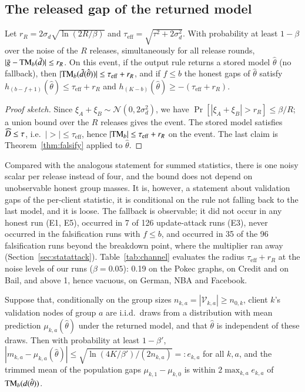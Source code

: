 \subsection{The released gap of the returned model}

\begin{theorem}\label{thm:output}
Let $r_R=2\sigma_d\sqrt{\ln(2R/\beta)}$ and $\tau_{\mathrm{eff}}=\sqrt{\tau^2+2\sigma_d^2}$. With probability at least $1-\beta$ over the noise of the $R$ releases, simultaneously for all release rounds, $|\tilde g-\mathrm{TM}_b(\tilde d)|\le r_R$. On this event, if the output rule returns a stored model $\hat\theta$ (no fallback), then $|\mathrm{TM}_b(\tilde d(\hat\theta))|\le\tau_{\mathrm{eff}}+r_R$, and if $f\le b$ the honest gaps of $\hat\theta$ satisfy $h_{(b-f+1)}(\hat\theta)\le\tau_{\mathrm{eff}}+r_R$ and $h_{(K-b)}(\hat\theta)\ge-(\tau_{\mathrm{eff}}+r_R)$.
\end{theorem}

\begin{proof}[Proof sketch]
Since $\xi_A+\xi_B\sim\mathcal{N}(0,2\sigma_d^2)$, we have $\Pr[|\xi_A+\xi_B|>r_R]\le\beta/R$; a union bound over the $R$ releases gives the event. The stored model satisfies $\widehat{D}\le\tau$, i.e.\ $|\gt|\le\tau_{\mathrm{eff}}$, hence $|\mathrm{TM}_b|\le\tau_{\mathrm{eff}}+r_R$ on the event. The last claim is Theorem~\ref{thm:falsify} applied to $\hat\theta$.
\end{proof}

Compared with the analogous statement for summed statistics, there is one noisy scalar per release instead of four, and the bound does not depend on unobservable honest group masses. It is, however, a statement about validation gaps of the per-client statistic, it is conditional on the rule not falling back to the last model, and it is loose. The fallback is observable; it did not occur in any honest run (E1, E5), occurred in 7 of 126 update-attack runs (E3), never occurred in the falsification runs with $f\le b$, and occurred in 35 of the 96 falsification runs beyond the breakdown point, where the multiplier ran away (Section~\ref{sec:statattack}). Table~\ref{tab:channel} evaluates the radius $\tau_{\mathrm{eff}}+r_R$ at the noise levels of our runs ($\beta=0.05$): 0.19 on the Pokec graphs, \radCredit{} on Credit and \radBail{} on Bail, and above 1, hence vacuous, on German, NBA and Facebook.

\begin{proposition}\label{prop:pop}
Suppose that, conditionally on the group sizes $n_{k,a}=|\mathcal{V}_{k,a}|\ge n_{0,k}$, client $k$'s validation nodes of group $a$ are i.i.d.\ draws from a distribution with mean prediction $\mu_{k,a}(\hat\theta)$ under the returned model, and that $\hat\theta$ is independent of these draws. Then with probability at least $1-\beta'$, $|m_{k,a}-\mu_{k,a}(\hat\theta)|\le\sqrt{\ln(4K/\beta')/(2n_{k,a})}=:e_{k,a}$ for all $k,a$, and the trimmed mean of the population gaps $\mu_{k,1}-\mu_{k,0}$ is within $2\max_{k,a}e_{k,a}$ of $\mathrm{TM}_b(d(\hat\theta))$.
\end{proposition}

